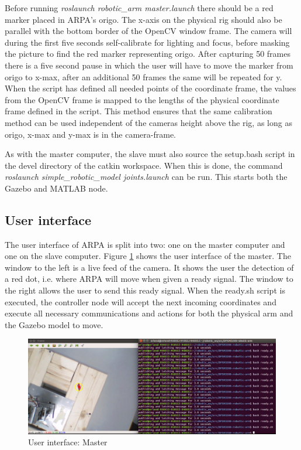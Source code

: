 \documentclass[11pt,a4paper, titlepage]{article}
\begin{document}
Before running \textit{roslaunch robotic\_arm master.launch} there should be a red marker placed in ARPA's origo. The x-axis on the physical rig should also be parallel with the bottom border of the OpenCV window frame. The camera will during the first five seconds self-calibrate for lighting and focus, before masking the picture to find the red marker representing origo. After capturing 50 frames there is a five second pause in which the user will have to move the marker from origo to x-max, after an additional 50 frames the same will be repeated for y. When the script has defined all needed points of the coordinate frame, the values from the OpenCV frame is mapped to the lengths of the physical coordinate frame defined in the script. This method ensures that the same calibration method can be used independent of the cameras height above the rig, as long as origo, x-max and y-max is in the camera-frame.
	
	As with the master computer, the slave must also source the setup.bash script in the devel directory of the catkin workspace. When this is done, the command \textit{roslaunch simple\_robotic\_model joints.launch} can be run. This starts both the Gazebo and MATLAB node.
	
	\subsection{User interface}

	The user interface of ARPA is split into two: one on the master computer and one on the slave computer. Figure \ref{fig:ui-master} shows the user interface of the master. The window to the left is a live feed of the camera. It shows the user the detection of a red dot, i.e. where ARPA will move when given a ready signal. The window to the right allows the user to send this ready signal. When the ready.sh script is executed, the controller node will accept the next incoming coordinates and execute all necessary communications and actions for both the physical arm and the Gazebo model to move.
	
	\begin{figure}[H]
		\centering
		\includegraphics[width=0.95\linewidth]{../Diagrams/UI-master.png}
		\caption{User interface: Master}
		\label{fig:ui-master}
	\end{figure}
	
\end{document}
